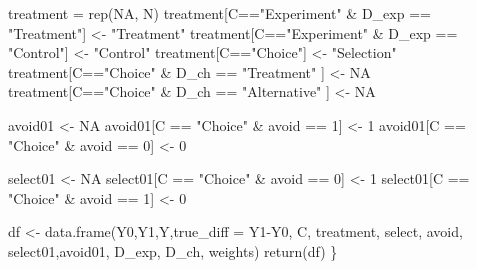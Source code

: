 \documentclass[
]{article}
\newenvironment{Shaded}{\begin{snugshade}}{\end{snugshade}}
\newcommand{\AttributeTok}[1]{\textcolor[rgb]{0.77,0.63,0.00}{#1}}
\newcommand{\ConstantTok}[1]{\textcolor[rgb]{0.00,0.00,0.00}{#1}}
\newcommand{\DecValTok}[1]{\textcolor[rgb]{0.00,0.00,0.81}{#1}}
\newcommand{\FunctionTok}[1]{\textcolor[rgb]{0.00,0.00,0.00}{#1}}
\newcommand{\NormalTok}[1]{#1}
\newcommand{\OtherTok}[1]{\textcolor[rgb]{0.56,0.35,0.01}{#1}}
\newcommand{\SpecialCharTok}[1]{\textcolor[rgb]{0.00,0.00,0.00}{#1}}
\newcommand{\StringTok}[1]{\textcolor[rgb]{0.31,0.60,0.02}{#1}}
\begin{document}
\begin{Shaded}
\begin{Highlighting}[]
  
\NormalTok{  treatment }\OtherTok{=} \FunctionTok{rep}\NormalTok{(}\ConstantTok{NA}\NormalTok{, N)}
\NormalTok{  treatment[C}\SpecialCharTok{==}\StringTok{"Experiment"} \SpecialCharTok{\&}\NormalTok{ D\_exp }\SpecialCharTok{==} \StringTok{"Treatment"}\NormalTok{] }\OtherTok{\textless{}{-}} \StringTok{"Treatment"}
\NormalTok{  treatment[C}\SpecialCharTok{==}\StringTok{"Experiment"} \SpecialCharTok{\&}\NormalTok{ D\_exp }\SpecialCharTok{==} \StringTok{"Control"}\NormalTok{] }\OtherTok{\textless{}{-}} \StringTok{"Control"}
\NormalTok{  treatment[C}\SpecialCharTok{==}\StringTok{"Choice"}\NormalTok{] }\OtherTok{\textless{}{-}} \StringTok{"Selection"}
\NormalTok{  treatment[C}\SpecialCharTok{==}\StringTok{"Choice"} \SpecialCharTok{\&}\NormalTok{ D\_ch }\SpecialCharTok{==} \StringTok{"Treatment"}\NormalTok{ ] }\OtherTok{\textless{}{-}} \ConstantTok{NA}
\NormalTok{  treatment[C}\SpecialCharTok{==}\StringTok{"Choice"} \SpecialCharTok{\&}\NormalTok{ D\_ch }\SpecialCharTok{==} \StringTok{"Alternative"}\NormalTok{ ] }\OtherTok{\textless{}{-}} \ConstantTok{NA}
  
\NormalTok{  avoid01 }\OtherTok{\textless{}{-}} \ConstantTok{NA}
\NormalTok{  avoid01[C }\SpecialCharTok{==} \StringTok{"Choice"} \SpecialCharTok{\&}\NormalTok{ avoid }\SpecialCharTok{==} \DecValTok{1}\NormalTok{] }\OtherTok{\textless{}{-}} \DecValTok{1}
\NormalTok{  avoid01[C }\SpecialCharTok{==} \StringTok{"Choice"} \SpecialCharTok{\&}\NormalTok{ avoid }\SpecialCharTok{==} \DecValTok{0}\NormalTok{] }\OtherTok{\textless{}{-}} \DecValTok{0}
  
\NormalTok{  select01 }\OtherTok{\textless{}{-}} \ConstantTok{NA}
\NormalTok{  select01[C }\SpecialCharTok{==} \StringTok{"Choice"} \SpecialCharTok{\&}\NormalTok{ avoid }\SpecialCharTok{==} \DecValTok{0}\NormalTok{] }\OtherTok{\textless{}{-}} \DecValTok{1}
\NormalTok{  select01[C }\SpecialCharTok{==} \StringTok{"Choice"} \SpecialCharTok{\&}\NormalTok{ avoid }\SpecialCharTok{==} \DecValTok{1}\NormalTok{] }\OtherTok{\textless{}{-}} \DecValTok{0}
  
\NormalTok{  df }\OtherTok{\textless{}{-}} \FunctionTok{data.frame}\NormalTok{(Y0,Y1,Y,}\AttributeTok{true\_diff =}\NormalTok{ Y1}\SpecialCharTok{{-}}\NormalTok{Y0,}
\NormalTok{                   C, treatment, select, avoid,}
\NormalTok{                   select01,avoid01, }
\NormalTok{                   D\_exp, D\_ch, weights)}
  \FunctionTok{return}\NormalTok{(df)}
\NormalTok{\}}
\end{Highlighting}
\end{Shaded}
\end{document}
